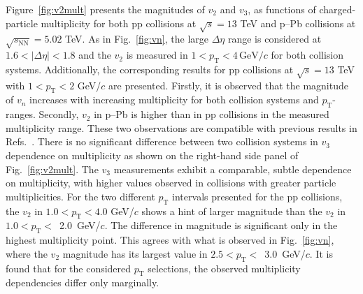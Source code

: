 Figure~\ref{fig:v2mult} presents the magnitudes of $v_2$ and $v_3$, as functions of charged-particle multiplicity for both pp collisions at $\sqrt{s}=13$ TeV and p--Pb collisions at $\sqrt{s_\mathrm{NN}}=5.02$ TeV. As in Fig.~\ref{fig:vn}, the large $\Delta\eta$ range is considered at $1.6<|\Delta\eta|<1.8$ and the $v_2$ is measured in $1<p_{\mathrm{T}}<4\,\mathrm{GeV}/c$ for both collision systems. Additionally, the corresponding results for pp collisions at $\sqrt{s}=13$ TeV with $1<p_{\mathrm{T}}<2$ GeV/$c$ are presented. Firstly, it is observed that the magnitude of $v_n$ increases with increasing multiplicity for both collision systems and $p_\mathrm{T}$-ranges. Secondly, $v_2$ in p--Pb is higher than in pp collisions in the measured multiplicity range. These two observations are compatible with previous results in Refs.~\cite{ATLAS:2015hzw,ATLAS:2016yzd, Khachatryan:2015lva}. There is no significant difference between two collision systems in $v_3$ dependence on multiplicity as shown on the right-hand side panel of Fig.~\ref{fig:v2mult}. The $v_3$ measurements exhibit a comparable, subtle dependence on multiplicity, with higher values observed in collisions with greater particle multiplicities.
For the two different $p_\mathrm{T}$ intervals presented for the pp collisions, the $v_2$ in $1.0<p_\mathrm{T}<4.0$ GeV/$c$ shows a hint of larger magnitude than the $v_2$ in $1.0<p_\mathrm{T}<$~2.0~GeV/$c$. The difference in magnitude is significant only in the highest multiplicity point. %
This agrees with what is observed in Fig.~\ref{fig:vn}, where the $v_2$ magnitude has its largest value in $2.5<p_\mathrm{T}<$~3.0~GeV/$c$. It is found that for the considered $p_\mathrm{T}$ selections, the observed multiplicity dependencies differ only marginally. %


